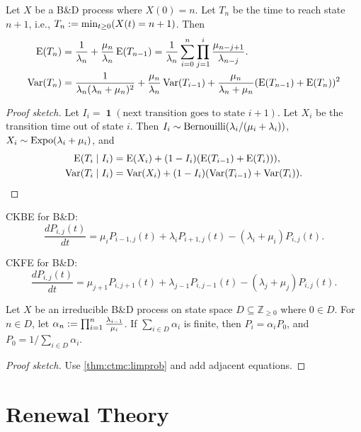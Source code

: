 \documentclass[a4paper, 12pt, fleqn]{article}
\DeclareMathOperator{\boolone}{\mathbf{1}}
\DeclareMathOperator{\Expo}{\opname{Expo}}
\begin{document}
\begin{lemma}
Let $X$ be a B\&D process where $X(0)=n$.
Let $T_n$ be the time to reach state $n+1$, i.e., $T_n := \min_{t \ge 0} (X(t) = n+1)$. Then
\begin{align*}
\operatorname*{E}(T_n) &= \frac{1}{\lambda_n} + \frac{\mu_n}{\lambda_n}\operatorname*{E}(T_{n-1})
= \frac{1}{\lambda_n}\sum_{i=0}^n \prod_{j=1}^i \frac{\mu_{n-j+1}}{\lambda_{n-j}}.
\\ \operatorname*{Var}(T_n) &= \frac{1}{\lambda_n(\lambda_n + \mu_n)^2} + \frac{\mu_n}{\lambda_n}\operatorname*{Var}(T_{i-1})
    + \frac{\mu_n}{\lambda_n + \mu_n}(\operatorname*{E}(T_{n-1}) + \operatorname*{E}(T_n))^2
\end{align*}
\end{lemma}
\begin{proof}[Proof sketch]
Let $I_i = \boolone(\textrm{next transition goes to state } i+1)$.
Let $X_i$ be the transition time out of state $i$.
Then $I_i \sim \operatorname{Bernouilli}(\lambda_i/(\mu_i + \lambda_i))$,
$X_i \sim \Expo(\lambda_i + \mu_i)$, and
\begin{align*}
\operatorname*{E}(T_i \mid I_i) &= \operatorname*{E}(X_i) + (1-I_i)(\operatorname*{E}(T_{i-1}) + \operatorname*{E}(T_i))),
\\ \operatorname*{Var}(T_i \mid I_i) &= \operatorname*{Var}(X_i) + (1-I_i)(\operatorname*{Var}(T_{i-1}) + \operatorname*{Var}(T_i)).
\qedhere \end{align*}
\end{proof}

CKBE for B\&D:
\[ \frac{dP_{i,j}(t)}{dt} = \mu_iP_{i-1,j}(t) + \lambda_iP_{i+1,j}(t) - (\lambda_i + \mu_i)P_{i,j}(t). \]

CKFE for B\&D:
\[ \frac{dP_{i,j}(t)}{dt} = \mu_{j+1}P_{i,j+1}(t) + \lambda_{j-1}P_{i,j-1}(t) - (\lambda_j + \mu_j)P_{i,j}(t). \]

\begin{theorem}
Let $X$ be an irreducible B\&D process on state space $D \subseteq \mathbb{Z}_{\ge 0}$ where $0 \in D$.
For $n \in D$, let $\alpha_n := \prod_{i=1}^n \frac{\lambda_{i-1}}{\mu_i}$.
If $\sum_{i \in D} \alpha_i$ is finite, then
$P_i = \alpha_iP_0$, and $P_0 = 1/\sum_{i \in D} \alpha_i$.
\end{theorem}
\begin{proof}[Proof sketch]
Use \cref{thm:ctmc:limprob} and add adjacent equations.
\end{proof}

\section{Renewal Theory}
\end{document}
